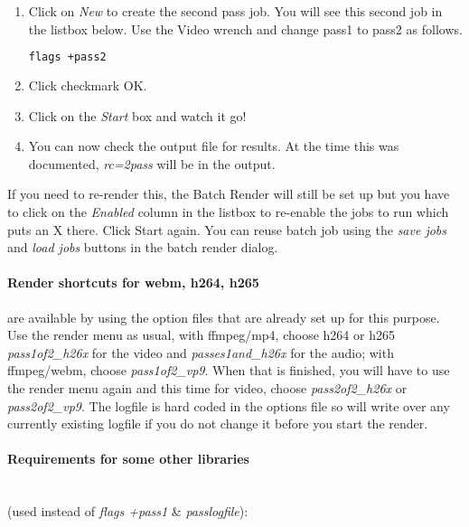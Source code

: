 \begin{enumerate}
    \item Click on \textit{New} to create the second pass job.  You will see this second job in the listbox below.
     Use the Video wrench and change pass1 to pass2 as follows.
        \begin{lstlisting}[language=bash,numbers=none]
flags +pass2
        \end{lstlisting}
    \item Click checkmark OK.
    \item Click on the \textit{Start} box and watch it go!
    \item You can now check the output file for results.  At the time this was documented, \textit{rc=2pass} will be
        in the output.    
\end{enumerate}

If you need to re-render this, the Batch Render will still be set up but you have to click on the \textit{Enabled} column in the listbox to re-enable the jobs to run which puts an X there.  Click Start again. You can reuse batch job using the \textit{save jobs} and \textit{load jobs} buttons in the batch render dialog.

\paragraph{Render shortcuts for webm, h264, h265} are available by using the option files that are already set up for this purpose.  Use the render menu as usual, with ffmpeg/mp4, choose h264 or h265 \textit{pass1of2\_h26x} for the video and \textit{passes1and\_h26x} for the audio; 
with ffmpeg/webm, choose \textit{pass1of2\_vp9}.  When that is finished, you will have to use the render menu again and this time for video, choose \textit{pass2of2\_h26x} or \textit{pass2of2\_vp9}.  The logfile is hard coded in the options file so will write over any currently existing logfile if you do not change it before you start the render.

\paragraph{Requirements for some other libraries} ~\\ (used instead of \textit{flags +pass1} \& \textit{passlogfile}):

